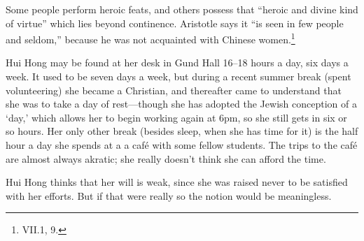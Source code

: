 \documentclass[11pt,letterpaper,oneside]{amsart}
\begin{document}






Some people perform heroic feats, and others possess that ``heroic and divine kind of virtue'' which lies beyond continence. Aristotle says it ``is seen in few people and seldom,'' because he was not acquainted with Chinese women.\footnote{ VII.1, 9.}\begin{squote} Hui Hong may be found at her desk in Gund Hall 16--18 hours a day, six days a week. It used to be seven days a week, but during a recent summer break (spent volunteering) she became a Christian, and thereafter came to understand that she was  to take a day of rest---though she has adopted the Jewish conception of a `day,' which allows her to begin working again at 6pm, so she still gets in six or so hours. Her only other break (besides sleep, when she has time for it) is the half hour a day she spends at a a caf\'e with some fellow students. The trips to the caf\'e are almost always akratic; she really doesn't think she can afford the time.\end{squote} Hui Hong thinks that her will is weak, since she was raised never to be satisfied with her efforts. But if that were really so the notion would be meaningless.



\end{document}
